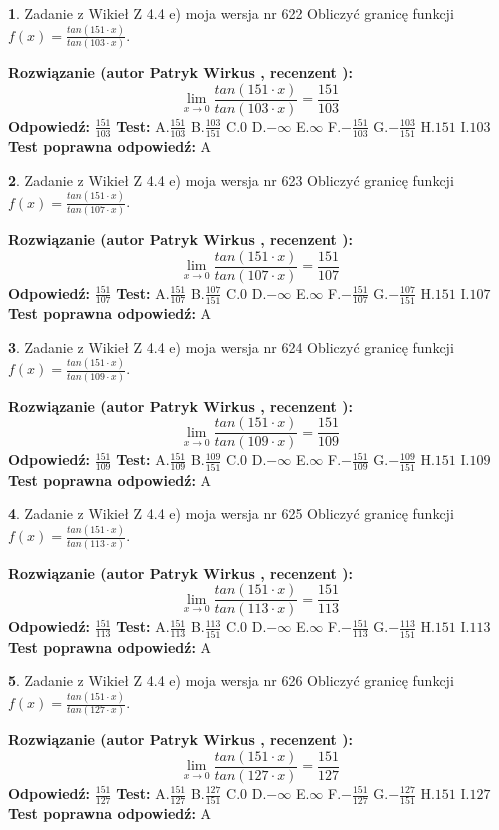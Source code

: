 \documentclass[12pt, a4paper]{article}
\theoremstyle{definition} %
\newtheorem{zad}{}
\newcommand{\zadStart}[1]{\begin{zad}#1\newline}
\newcommand{\zadStop}{\end{zad}}
\newcommand{\rozwStart}[2]{\noindent \textbf{Rozwiązanie (autor #1 , recenzent #2): }\newline}
\newcommand{\rozwStop}{\newline}
\newcommand{\odpStart}{\noindent \textbf{Odpowiedź:}\newline}
\newcommand{\odpStop}{\newline}
\newcommand{\testStart}{\noindent \textbf{Test:}\newline}
\newcommand{\testStop}{\newline}
\newcommand{\kluczStart}{\noindent \textbf{Test poprawna odpowiedź:}\newline}
\newcommand{\kluczStop}{\newline}
\begin{document}
\zadStart{Zadanie z Wikieł Z 4.4 e) moja wersja nr 622}
Obliczyć granicę funkcji $f(x)=\frac{tan(151\cdot x)}{tan(103\cdot x)}$.
\zadStop
\rozwStart{Patryk Wirkus}{}
$$\lim\limits_{x\to 0}\frac{tan(151\cdot x)}{tan(103\cdot x)}=
\frac{151}{103}$$
\rozwStop
\odpStart
$\frac{151}{103}$
\odpStop
\testStart
A.$\frac{151}{103}$
B.$\frac{103}{151}$
C.$0$
D.$-\infty$
E.$\infty$
F.$-\frac{151}{103}$
G.$-\frac{103}{151}$
H.$151$
I.$103$
\testStop
\kluczStart
A
\kluczStop



\zadStart{Zadanie z Wikieł Z 4.4 e) moja wersja nr 623}
Obliczyć granicę funkcji $f(x)=\frac{tan(151\cdot x)}{tan(107\cdot x)}$.
\zadStop
\rozwStart{Patryk Wirkus}{}
$$\lim\limits_{x\to 0}\frac{tan(151\cdot x)}{tan(107\cdot x)}=
\frac{151}{107}$$
\rozwStop
\odpStart
$\frac{151}{107}$
\odpStop
\testStart
A.$\frac{151}{107}$
B.$\frac{107}{151}$
C.$0$
D.$-\infty$
E.$\infty$
F.$-\frac{151}{107}$
G.$-\frac{107}{151}$
H.$151$
I.$107$
\testStop
\kluczStart
A
\kluczStop



\zadStart{Zadanie z Wikieł Z 4.4 e) moja wersja nr 624}
Obliczyć granicę funkcji $f(x)=\frac{tan(151\cdot x)}{tan(109\cdot x)}$.
\zadStop
\rozwStart{Patryk Wirkus}{}
$$\lim\limits_{x\to 0}\frac{tan(151\cdot x)}{tan(109\cdot x)}=
\frac{151}{109}$$
\rozwStop
\odpStart
$\frac{151}{109}$
\odpStop
\testStart
A.$\frac{151}{109}$
B.$\frac{109}{151}$
C.$0$
D.$-\infty$
E.$\infty$
F.$-\frac{151}{109}$
G.$-\frac{109}{151}$
H.$151$
I.$109$
\testStop
\kluczStart
A
\kluczStop



\zadStart{Zadanie z Wikieł Z 4.4 e) moja wersja nr 625}
Obliczyć granicę funkcji $f(x)=\frac{tan(151\cdot x)}{tan(113\cdot x)}$.
\zadStop
\rozwStart{Patryk Wirkus}{}
$$\lim\limits_{x\to 0}\frac{tan(151\cdot x)}{tan(113\cdot x)}=
\frac{151}{113}$$
\rozwStop
\odpStart
$\frac{151}{113}$
\odpStop
\testStart
A.$\frac{151}{113}$
B.$\frac{113}{151}$
C.$0$
D.$-\infty$
E.$\infty$
F.$-\frac{151}{113}$
G.$-\frac{113}{151}$
H.$151$
I.$113$
\testStop
\kluczStart
A
\kluczStop



\zadStart{Zadanie z Wikieł Z 4.4 e) moja wersja nr 626}
Obliczyć granicę funkcji $f(x)=\frac{tan(151\cdot x)}{tan(127\cdot x)}$.
\zadStop
\rozwStart{Patryk Wirkus}{}
$$\lim\limits_{x\to 0}\frac{tan(151\cdot x)}{tan(127\cdot x)}=
\frac{151}{127}$$
\rozwStop
\odpStart
$\frac{151}{127}$
\odpStop
\testStart
A.$\frac{151}{127}$
B.$\frac{127}{151}$
C.$0$
D.$-\infty$
E.$\infty$
F.$-\frac{151}{127}$
G.$-\frac{127}{151}$
H.$151$
I.$127$
\testStop
\kluczStart
A
\kluczStop
\end{document}
